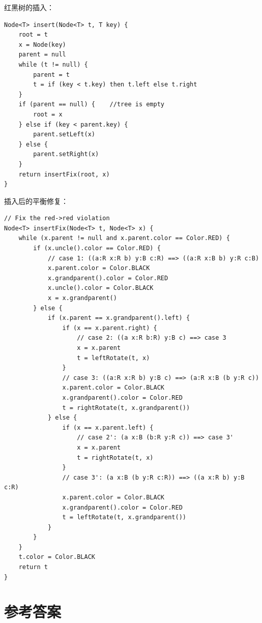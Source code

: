 \documentclass[b5paper]{ctexart}
\begin{document}
红黑树的插入：

\begin{lstlisting}[language = Bourbaki]
Node<T> insert(Node<T> t, T key) {
    root = t
    x = Node(key)
    parent = null
    while (t != null) {
        parent = t
        t = if (key < t.key) then t.left else t.right
    }
    if (parent == null) {    //tree is empty
        root = x
    } else if (key < parent.key) {
        parent.setLeft(x)
    } else {
        parent.setRight(x)
    }
    return insertFix(root, x)
}
\end{lstlisting}

插入后的平衡修复：

\begin{lstlisting}[language = Bourbaki]
// Fix the red->red violation
Node<T> insertFix(Node<T> t, Node<T> x) {
    while (x.parent != null and x.parent.color == Color.RED) {
        if (x.uncle().color == Color.RED) {
            // case 1: ((a:R x:R b) y:B c:R) ==> ((a:R x:B b) y:R c:B)
            x.parent.color = Color.BLACK
            x.grandparent().color = Color.RED
            x.uncle().color = Color.BLACK
            x = x.grandparent()
        } else {
            if (x.parent == x.grandparent().left) {
                if (x == x.parent.right) {
                    // case 2: ((a x:R b:R) y:B c) ==> case 3
                    x = x.parent
                    t = leftRotate(t, x)
                }
                // case 3: ((a:R x:R b) y:B c) ==> (a:R x:B (b y:R c))
                x.parent.color = Color.BLACK
                x.grandparent().color = Color.RED
                t = rightRotate(t, x.grandparent())
            } else {
                if (x == x.parent.left) {
                    // case 2': (a x:B (b:R y:R c)) ==> case 3'
                    x = x.parent
                    t = rightRotate(t, x)
                }
                // case 3': (a x:B (b y:R c:R)) ==> ((a x:R b) y:B c:R)
                x.parent.color = Color.BLACK
                x.grandparent().color = Color.RED
                t = leftRotate(t, x.grandparent())
            }
        }
    }
    t.color = Color.BLACK
    return t
}
\end{lstlisting}

\ifx\wholebook\relax \else
\section{参考答案}
\shipoutAnswer
\end{document}
